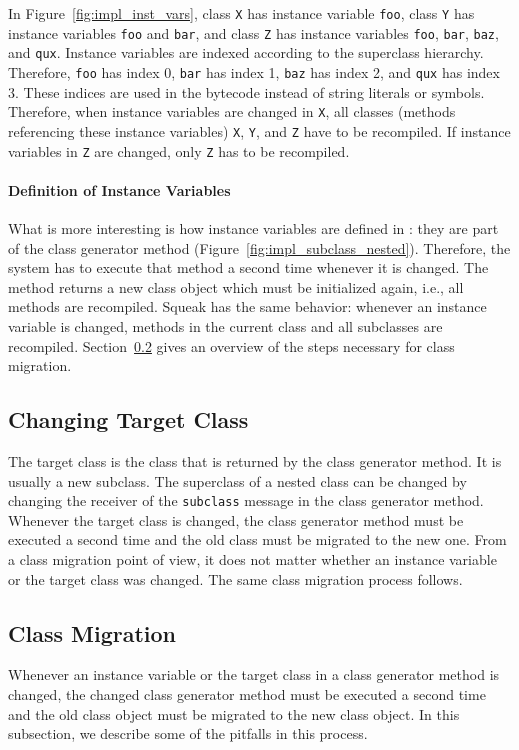 In Figure~\ref{fig:impl_inst_vars}, class \texttt{X} has instance variable \texttt{foo}, class \texttt{Y} has instance variables \texttt{foo} and \texttt{bar}, and class \texttt{Z} has instance variables \texttt{foo}, \texttt{bar}, \texttt{baz}, and \texttt{qux}. Instance variables are indexed according to the superclass hierarchy. Therefore, \texttt{foo} has index 0, \texttt{bar} has index 1, \texttt{baz} has index 2, and \texttt{qux} has index 3. These indices are used in the bytecode instead of string literals or symbols. Therefore, when instance variables are changed in \texttt{X}, all classes (methods referencing these instance variables) \texttt{X}, \texttt{Y}, and \texttt{Z} have to be recompiled. If instance variables in \texttt{Z} are changed, only \texttt{Z} has to be recompiled.

\paragraph{Definition of Instance Variables}
What is more interesting is how instance variables are defined in \msname: they are part of the class generator method (Figure~\ref{fig:impl_subclass_nested}). Therefore, the system has to execute that method a second time whenever it is changed. The method returns a new class object which must be initialized again, i.e., all methods are recompiled. Squeak has the same behavior: whenever an instance variable is changed, methods in the current class and all subclasses are recompiled. Section~\ref{sec:impl_migration} gives an overview of the steps necessary for class migration.

\subsection{Changing Target Class}
The target class is the class that is returned by the class generator method. It is usually a new subclass. The superclass of a nested class can be changed by changing the receiver of the \texttt{subclass} message in the class generator method. Whenever the target class is changed, the class generator method must be executed a second time and the old class must be migrated to the new one. From a class migration point of view, it does not matter whether an instance variable or the target class was changed. The same class migration process follows.

\subsection{Class Migration}
\label{sec:impl_migration}
Whenever an instance variable or the target class in a class generator method is changed, the changed class generator method must be executed a second time and the old class object must be migrated to the new class object. In this subsection, we describe some of the pitfalls in this process.

